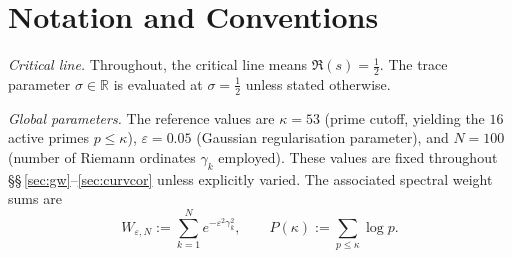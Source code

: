 \documentclass[11pt]{article}
\begin{document}
\begin{abstract}
\textbf{Structure.}
The formal core in \S\S\,\ref{sec:gw}--\ref{sec:curvcor} is non-circular;
analytic identities, numerical observations, and conditional statements
are explicitly separated.
No use of the Riemann Hypothesis, the GUE conjecture, the Montgomery
pair correlation conjecture, or the Hilbert--P\'olya postulate is made
anywhere in \S\S\,\ref{sec:gw}--\ref{sec:curvcor}.
\end{abstract}

\vspace{2em}

\section*{Notation and Conventions}
\label{sec:notation}

\emph{Critical line.}
Throughout, the critical line means $\Re(s)=\tfrac12$.
The trace parameter $\sigma\in\mathbb{R}$ is evaluated at
$\sigma=\tfrac12$ unless stated otherwise.

\medskip
\emph{Global parameters.}
The reference values are $\kappa=53$ (prime cutoff, yielding the
$16$ active primes $p\le\kappa$), $\varepsilon=0.05$ (Gaussian
regularisation parameter), and $N=100$ (number of Riemann ordinates
$\gamma_k$ employed).
These values are fixed throughout
\S\S\,\ref{sec:gw}--\ref{sec:curvcor} unless explicitly varied.
The associated spectral weight sums are
\[
W_{\varepsilon,N}:=\sum_{k=1}^N e^{-\varepsilon^2\gamma_k^2},
\qquad
P(\kappa):=\sum_{p\le\kappa}\log p.
\]
\end{document}
